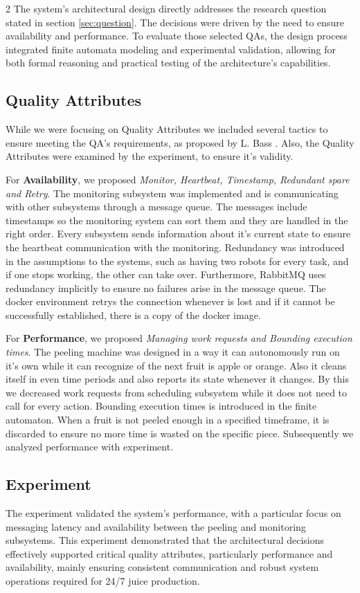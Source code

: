 \documentclass{article}
\begin{document}
\begin{multicols}{2}
The system’s architectural design directly addresses the research question stated in section \ref{sec:question}. The decisions were driven by the need to ensure availability and performance. To evaluate those selected QAs, the design process integrated finite automata modeling and experimental validation, allowing for both formal reasoning and practical testing of the architecture's capabilities.

\subsection{Quality Attributes}
While we were focusing on Quality Attributes we included several tactics to ensure meeting the QA's requirements, as proposed by L. Bass \cite{b1}. Also, the Quality Attributes were examined by the experiment, to ensure it's validity. 

For \textbf{Availability}, we proposed \textit{Monitor, Heartbeat, Timestamp, Redundant spare and Retry}. The monitoring subsystem was implemented and is communicating with other subsystems through a message queue. The messages include timestamps so the monitoring system can sort them and they are handled in the right order. Every subsystem sends information about it's current state to ensure the heartbeat communication with the monitoring. Redundancy was introduced in the assumptions to the systems, such as having two robots for every task, and if one stops working, the other can take over. Furthermore, RabbitMQ uses redundancy implicitly to ensure no failures arise in the message queue. The docker environment retrys the connection whenever is lost and if it cannot be successfully established, there is a copy of the docker image.

For \textbf{Performance}, we proposed \textit{Managing work requests and Bounding execution times}. The peeling machine was designed in a way it can autonomously run on it's own while it can recognize of the next fruit is apple or orange. Also it cleans itself in even time periods and also reports its state whenever it changes. By this we decreased work requests from scheduling subsystem while it does not need to call for every action. Bounding execution times is introduced in the finite automaton. When a fruit is not peeled enough in a specified timeframe, it is discarded to ensure no more time is wasted on the specific piece. Subsequently we analyzed performance with experiment. 

\subsection{Experiment}
The experiment validated the system's performance, with a particular focus on messaging latency and availability between the peeling and monitoring subsystems. This experiment demonstrated that the architectural decisions effectively supported critical quality attributes, particularly performance and availability, mainly ensuring consistent communication and robust system operations required for 24/7 juice production.


\end{multicols}
\end{document}
